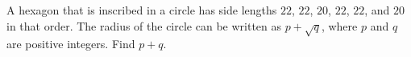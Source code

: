 A hexagon that is inscribed in a circle has side lengths $22$, $22$, $20$, $22$, $22$, and $20$ in that order.  The radius of the circle can be written as $p+\sqrt{q}$, where $p$ and $q$ are positive integers.  Find $p+q$.